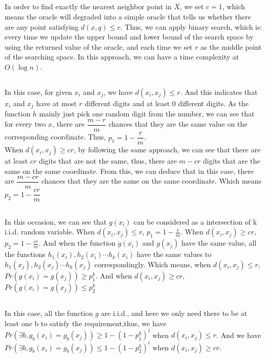 \documentclass{article}
\begin{document}
\subsection{}
In order to find exactly the nearest neighbor point in $ X $, we set $ c=1 $, which means the oracle will degraded into a simple oracle that tells us whether there are any point satisfying $ d(x,q)\leq r $. Thus, we can apply binary search, which is: every time we update the upper bound and lower bound of the search space by using the returned value of the oracle, and each time we set $ r $ as the middle point of the searching space. In this approach, we can have a time complexity at $ O(\log n) $.
\subsection{}
In this case, for given $ x_i $ and $ x_j $, we have $ d(x_i, x_j)\leq r $. And this indicates that $ x_i $ and $ x_j $ have at most $ r $ different digits and at least $ 0 $ different digits. As the function $ h $ mainly just pick one random digit from the number, we can see that for every two $ x $, there are $ \dfrac{m - r}{m} $ chances that they are the same value on the corresponding coordinate. Thus, $ p_1 = 1 - \dfrac{r}{m} $.\\
When $ d(x_i, x_j) \geq cr $, by following the same approach, we can see that there are at least $ cr $ digits that are not the same, thus, there are $ m - cr $ digits that are the same on the same coordinate. From this, we can deduce that in this case, there are $ \dfrac{m - cr}{m} $ chances that they are the same on the same coordinate. Which means $ p_2 = 1 - \dfrac{cr}{m} $
\subsection{}
In this occasion, we can see that $ g(x_i) $ can be considered as a intersection of k i.i.d. random variable. When $ d(x_i, x_j) \leq r$, $ p_1 = 1 - \frac{r}{m} $. When $ d(x_i, x_j)\geq cr $, $ p_2 = 1 - \frac{cr}{m} $. And when the function $ g(x_i) $ and $ g(x_j) $ have the same value, all the functions $ h_1(x_i), h_2(x_i)\cdots h_k(x_i) $ have the same values to $ h_1(x_j), h_2(x_j)\cdots h_k(x_j) $ correspondingly. Which means, when $ d(x_i, x_j)\leq r $, $ Pr(g(x_i)=g(x_j)) \geq p_1^k $. And when $ d(x_i, x_j)\geq cr $, $ Pr(g(x_i) = g(x_j))\leq p_2^k $
\subsection{}
In this case, all the function $ g $ are i.i.d., and here we only need there to be at least one b to satisfy the requirement,thus, we have $ Pr(\exists b, g_b(x_i) = g_b(x_j)) \geq 1 - ( 1 - p_1^k)^l $ when $ d(x_i, x_j) \leq r $. And we have $ Pr(\exists b, g_b(x_i) = g_b(x_j))\leq 1 - (1-p_2^k)^l $ when $ d(x_i, x_j) \geq cr $. 
\end{document}
